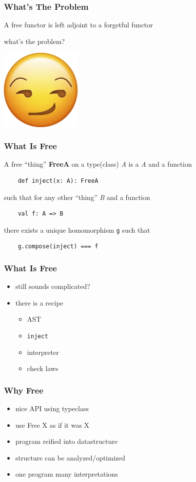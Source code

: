 \documentclass{beamer}
\newcommand{\recipe}{%
  \begin{itemize}
  \item AST
  \item \texttt{inject}
  \item interpreter
  \item check laws
  \end{itemize}
}
\begin{document}
\begin{frame}
  \frametitle{What's The Problem}
  \begin{center}
    A free functor is left adjoint to a forgetful functor
  \end{center}
  \begin{center}
    what's the problem?
  \end{center}
  \begin{center}
    \includegraphics[width=0.3\textwidth]{static-images/smirk.png}
  \end{center}
\end{frame}

\begin{frame}[fragile]
  \frametitle{What Is Free} A free ``thing'' \textbf{FreeA} on a type(class)
  \textit{A} is a \textit{A} and a function
  \begin{verbatim}
    def inject(x: A): FreeA
  \end{verbatim}
  such that for any other ``thing'' \textit{B} and a function
  \begin{verbatim}
    val f: A => B
  \end{verbatim}
  there exists a unique homomorphism \texttt{g} such that
  \begin{verbatim}
    g.compose(inject) === f
  \end{verbatim}
\end{frame}

\begin{frame}[fragile]
  \frametitle{What Is Free}
  \begin{itemize}
  \item still sounds complicated?
  \item there is a recipe
    \recipe{}
  \end{itemize}
\end{frame}

\begin{frame}
  \frametitle{Why Free}
  \begin{itemize}
  \item nice API using typeclass
  \item use Free X as if it was X
  \item program reified into datastructure
  \item structure can be analyzed/optimized
  \item one program \textemdash{} many interpretations
  \end{itemize}
\end{frame}
\end{document}
